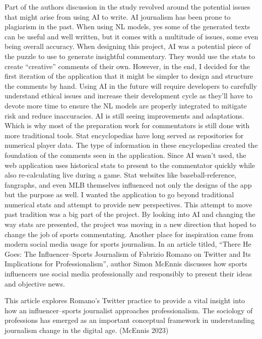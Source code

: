 \documentclass[10pt,twocolumn]{article}
\begin{document}
Part of the authors discussion in the study revolved around the potential issues that might arise from using AI to write. AI journalism has been prone to plagiarism in the past. When using NL models, yes some of the generated texts can be useful and well written, but it comes with a multitude of issues, some even being overall accuracy. When designing this project, AI was a potential piece of the puzzle to use to generate insightful commentary. They would use the stats to create “creative” comments of their own. However, in the end, I decided for the first iteration of the application that it might be simpler to design and structure the comments by hand. Using AI in the future will require developers to carefully understand ethical issues and increase their development cycle as they’ll have to devote more time to ensure the NL models are properly integrated to mitigate risk and reduce inaccuracies. \break
\indent AI is still seeing improvements and adaptations. Which is why most of the preparation work for commentators is still done with more traditional tools. Stat encyclopedias have long served as repositories for numerical player data. The type of information in these encyclopedias created the foundation of the comments seen in the application. Since AI wasn't used, the web application uses historical stats to present to the commentator quickly while also re-calculating live during a game. Stat websites like baseball-reference, fangraphs, and even MLB themselves influenced not only the designs of the app but the purpose as well. I wanted the application to go beyond traditional numerical stats and attempt to provide new perspectives. \break
\indent This attempt to move past tradition was a big part of the project. By looking into AI and changing the way stats are presented, the project was moving in a new direction that hoped to change the job of sports commentating. Another place for inspiration came from modern social media usage for sports journalism. In an article titled, “There He Goes: The Influencer–Sports Journalism of Fabrizio Romano on Twitter and Its Implications for Professionalism”, author Simon McEnnis discusses how sports influencers use social media professionally and responsibly to present their ideas and objective news. 

\begin{displayquote}
This article explores Romano’s Twitter practice to provide a vital insight into how an influencer–sports journalist approaches professionalism. The sociology of professions has emerged as an important conceptual framework in understanding journalism change in the digital age. (McEnnis 2023)
\end{displayquote}
\cite{mcennis2023}
\end{document}
